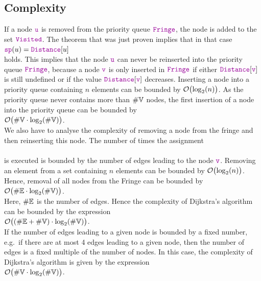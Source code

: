 \subsection{Complexity}
If a node $\mytt{u}$ is removed from the priority queue $\mytt{Fringe}$, the node is added to the set
$\mytt{Visited}$.  The theorem that was just proven implies that in that case
\\[0.2cm]
\hspace*{1.3cm}
$\mytt{sp}(u) = \mytt{Distance}[u]$
\\[0.2cm]
holds.  This implies that the node $\mytt{u}$ can never be reinserted into the priority queue
$\mytt{Fringe}$, because a node $\mytt{v}$ is only inserted in $\mytt{Fringe}$ if either 
 $\mytt{Distance}[\mytt{v}]$ is still undefined or if  the  value $\mytt{Distance}[\mytt{v}]$ decreases.  
Inserting a node into a priority queue containing  $n$ elements can be bounded by
$\mathcal{O}\bigl(\log_2(n)\bigr)$.  As the priority queue never contains more than $\#{\mathbb V}$ nodes,
the first insertion of a node into the priority queue can be bounded by
\\[0.2cm]
\hspace*{1.3cm}
$\mathcal{O}\bigl(\#{\mathbb V} \cdot \log_2(\#{\mathbb V})\bigr)$.
\\[0.2cm]
We also have to analyse the complexity of removing a node from the fringe and then reinserting this node.
The number of times the assignment
\\[0.2cm]
\hspace*{1.3cm}
\\[0.2cm]
is executed is bounded by the number of edges leading to the node $\mytt{v}$.
Removing an element from a set containing $n$ elements can be bounded by
 $\mathcal{O}\bigl(\log_2(n)\bigr)$.  Hence, removal of all nodes from the Fringe can be bounded by
\\[0.2cm]
\hspace*{1.3cm}
$\mathcal{O}\bigl(\#{\mathbb E} \cdot \log_2(\#{\mathbb V})\bigr)$.
\\[0.2cm]
Here,  $\#{\mathbb E}$ is the number of edges.  Hence the complexity of Dijkstra's algorithm can be
bounded by the expression \\[0.2cm]
\hspace*{1.3cm} $\mathcal{O}\bigl((\#{\mathbb E} + \#{\mathbb V}) \cdot \log_2(\#{\mathbb V})\bigr)$. \\[0.2cm]
If the number of edges leading  to a given node is bounded by a fixed number, e.g.~if there
are at most 4 edges leading to a given node, then the number of edges is a fixed multiple of the
number of nodes.  In this case, the complexity of 
 Dijkstra's algorithm is given by the expression  
\\[0.2cm]
\hspace*{1.3cm}
$\mathcal{O}\bigl(\#{\mathbb V} \cdot \log_2(\#{\mathbb V})\bigr)$.

